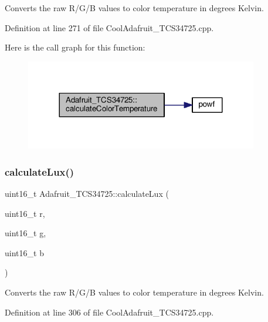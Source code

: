 Converts the raw R/\+G/B values to color temperature in degrees Kelvin. 



Definition at line 271 of file Cool\+Adafruit\+\_\+\+T\+C\+S34725.\+cpp.

Here is the call graph for this function\+:\nopagebreak
\begin{figure}[H]
\begin{center}
\leavevmode
\includegraphics[width=288pt]{class_adafruit___t_c_s34725_a9c6c7ab8a84a47a65ff04a125bcfee92_cgraph}
\end{center}
\end{figure}
\mbox{\label{class_adafruit___t_c_s34725_a10b9be546ee3bdf04e0380161aad589b}} 
\subsubsection{\texorpdfstring{calculate\+Lux()}{calculateLux()}}
{\footnotesize\ttfamily uint16\+\_\+t Adafruit\+\_\+\+T\+C\+S34725\+::calculate\+Lux (\begin{DoxyParamCaption}\item[{uint16\+\_\+t}]{r,  }\item[{uint16\+\_\+t}]{g,  }\item[{uint16\+\_\+t}]{b }\end{DoxyParamCaption})}



Converts the raw R/\+G/B values to color temperature in degrees Kelvin. 



Definition at line 306 of file Cool\+Adafruit\+\_\+\+T\+C\+S34725.\+cpp.

\mbox{\label{class_adafruit___t_c_s34725_a731a3542039027f75170b667aaf8e3a0}} 
